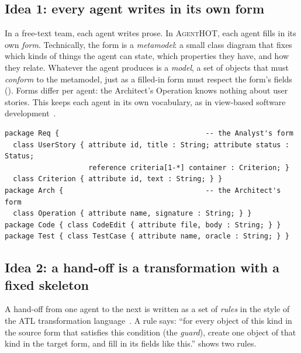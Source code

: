 \documentclass[10pt,a4paper]{article}
\newcommand{\tool}{\textsc{AgentHOT}}
\newcommand{\devteam}{\textsc{DevTeam}}
\newcommand{\cls}[1]{\textsf{#1}}
\begin{document}
\subsection{Idea 1: every agent writes in its own form}

In a free-text team, each agent writes prose. In \tool{}, each agent fills
in its own \emph{form}. Technically, the form is a \emph{metamodel}: a small
class diagram that fixes which kinds of things the agent can state, which
properties they have, and how they relate. Whatever the agent produces is a
\emph{model}, a set of objects that must \emph{conform} to the metamodel,
just as a filled-in form must respect the form's fields
(). Forms differ per agent: the Architect's
\cls{Operation} knows nothing about user stories. This keeps each agent in
its own vocabulary, as in view-based software
development~\cite{klare2021vitruvius,bruneliere2019views}.

\begin{lstlisting}[language=KM3, style=model, caption={View metamodels of \devteam{} (KM3-like notation).}, label={lst:views}]
package Req {                                   -- the Analyst's form
  class UserStory { attribute id, title : String; attribute status : Status;
                    reference criteria[1-*] container : Criterion; }
  class Criterion { attribute id, text : String; } }
package Arch {                                  -- the Architect's form
  class Operation { attribute name, signature : String; } }
package Code { class CodeEdit { attribute file, body : String; } }
package Test { class TestCase { attribute name, oracle : String; } }
\end{lstlisting}

\subsection{Idea 2: a hand-off is a transformation with a fixed skeleton}

A hand-off from one agent to the next is written as a set of
\emph{rules} in the style of the ATL transformation
language~\cite{jouault2008atl}. A rule says: ``for every object of this
kind in the source form that satisfies this condition (the \emph{guard}),
create one object of that kind in the target form, and fill in its fields
like this.''  shows two rules.
\end{document}
